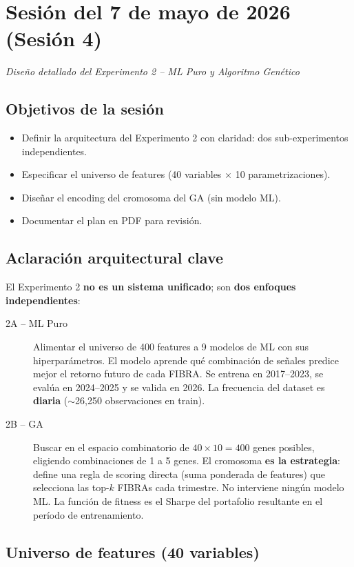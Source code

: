 \documentclass[12pt, a4paper]{article}
\newcommand{\sesion}[2]{%
  \section{Sesi\'{o}n del #1}%
  \textit{#2}%
  \vspace{0.5em}%
}
\begin{document}
\newpage
\sesion{7 de mayo de 2026 (Sesi\'{o}n 4)}{Dise\~{n}o detallado del Experimento 2 -- ML Puro y Algoritmo Gen\'{e}tico}

\subsection{Objetivos de la sesi\'{o}n}
\begin{itemize}
  \item Definir la arquitectura del Experimento 2 con claridad: dos sub-experimentos independientes.
  \item Especificar el universo de features (40 variables $\times$ 10 parametrizaciones).
  \item Dise\~{n}ar el encoding del cromosoma del GA (sin modelo ML).
  \item Documentar el plan en PDF para revisi\'{o}n.
\end{itemize}

\subsection{Aclaraci\'{o}n arquitectural clave}

El Experimento 2 \textbf{no es un sistema unificado}; son \textbf{dos enfoques independientes}:

\begin{description}
  \item[2A -- ML Puro] Alimentar el universo de 400 features a 9 modelos de ML con
    sus hiperpar\'{a}metros. El modelo aprende qu\'{e} combinaci\'{o}n de se\~{n}ales predice
    mejor el retorno futuro de cada FIBRA. Se entrena en 2017--2023, se eval\'{u}a
    en 2024--2025 y se valida en 2026. La frecuencia del dataset es \textbf{diaria}
    ($\sim$26{,}250 observaciones en train).

  \item[2B -- GA] Buscar en el espacio combinatorio de
    $40 \times 10 = 400$ genes posibles, eligiendo combinaciones de 1 a 5 genes.
    El cromosoma \textbf{es la estrategia}: define una regla de scoring directa
    (suma ponderada de features) que selecciona las top-$k$ FIBRAs cada trimestre.
    No interviene ning\'{u}n modelo ML. La funci\'{o}n de fitness es el Sharpe
    del portafolio resultante en el per\'{i}odo de entrenamiento.
\end{description}

\subsection{Universo de features (40 variables)}
\end{document}
